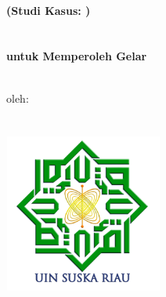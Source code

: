\begin{titlepage}
    \begin{center}
        \fontsize{14pt}{16.8pt}\selectfont\MakeUppercase{\bo{\judul}}\\
        \bfseries(Studi Kasus: \namaInstansi)\\
        \vspace{1.5cm}
        \fontsize{16pt}{19.2pt}\selectfont\MakeUppercase{\bo{\tipeta}}\\
        \vspace{1.5cm}
        \fontsize{11pt}{13.2pt}\selectfont {}\\
        untuk Memperoleh Gelar \gelar \space\\  \programStudi\\
        \vspace{1.5cm}

        \fontsize{13.5pt}{16.2pt}\selectfont oleh:\\
        \MakeUppercase{\bo{\underline{\penulis}}}\\
        \MakeUppercase{\bo{\nim}}\\


        \vfill
        \includegraphics[width=5.2cm, height=5.2cm]{kontrol/gambar/logouin.png}
        \vfill

        \fontsize{13.5pt}{16.2pt}\selectfont\MakeUppercase{\bo{\fakultas}}\\
        \MakeUppercase{\bo{\universitas}}\\
        \MakeUppercase{\bo{\kota}}\\
        \bo{\tahun}\\
    \end{center}
\end{titlepage}